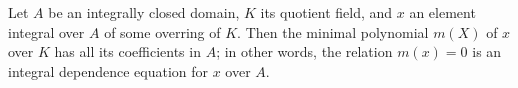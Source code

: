 Let $A$ be an integrally closed domain, $K$ its quotient field, and $x$ an element integral over $A$ of some overring of $K$. Then the minimal polynomial $m(X)$ of $x$ over $K$ has all its coefficients in $A$; in other words, the relation $m(x) = 0$ is an integral dependence equation for $x$ over $A$.
